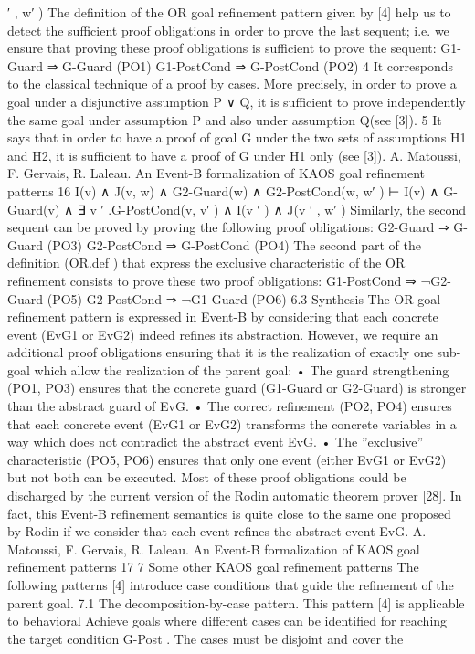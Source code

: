 ′
, w′
)
The definition of the OR goal refinement pattern given by [4] help us to detect the sufficient
proof obligations in order to prove the last sequent; i.e. we ensure that proving these proof
obligations is sufficient to prove the sequent:
G1-Guard ⇒ G-Guard (PO1)
G1-PostCond ⇒ G-PostCond (PO2)
4
It corresponds to the classical technique of a proof by cases. More precisely, in order to prove a goal under
a disjunctive assumption P ∨ Q, it is sufficient to prove independently the same goal under assumption P and
also under assumption Q(see [3]).
5
It says that in order to have a proof of goal G under the two sets of assumptions H1 and H2, it is sufficient
to have a proof of G under H1 only (see [3]).
A. Matoussi, F. Gervais, R. Laleau. An Event-B formalization of KAOS goal refinement patterns 16
I(v) ∧ J(v, w) ∧ G2-Guard(w) ∧ G2-PostCond(w, w′
)
⊢
I(v) ∧ G-Guard(v) ∧ ∃ v
′
.G-PostCond(v, v′
) ∧ I(v
′
) ∧ J(v
′
, w′
)
Similarly, the second sequent can be proved by proving the following proof obligations:
G2-Guard ⇒ G-Guard (PO3)
G2-PostCond ⇒ G-PostCond (PO4)
The second part of the definition (OR.def ) that express the exclusive characteristic of the
OR refinement consists to prove these two proof obligations:
G1-PostCond ⇒ ¬G2-Guard (PO5)
G2-PostCond ⇒ ¬G1-Guard (PO6)
6.3 Synthesis
The OR goal refinement pattern is expressed in Event-B by considering that each concrete
event (EvG1 or EvG2) indeed refines its abstraction. However, we require an additional
proof obligations ensuring that it is the realization of exactly one sub-goal which allow the
realization of the parent goal:
• The guard strengthening (PO1, PO3) ensures that the concrete guard (G1-Guard or
G2-Guard) is stronger than the abstract guard of EvG.
• The correct refinement (PO2, PO4) ensures that each concrete event (EvG1 or
EvG2) transforms the concrete variables in a way which does not contradict the abstract event EvG.
• The ”exclusive” characteristic (PO5, PO6) ensures that only one event (either EvG1
or EvG2) but not both can be executed.
Most of these proof obligations could be discharged by the current version of the Rodin
automatic theorem prover [28]. In fact, this Event-B refinement semantics is quite close to
the same one proposed by Rodin if we consider that each event refines the abstract event
EvG.
A. Matoussi, F. Gervais, R. Laleau. An Event-B formalization of KAOS goal refinement patterns 17
7 Some other KAOS goal refinement patterns
The following patterns [4] introduce case conditions that guide the refinement of the parent
goal.
7.1 The decomposition-by-case pattern.
This pattern [4] is applicable to behavioral Achieve goals where different cases can be identified for reaching the target condition G-Post . The cases must be disjoint and cover the
